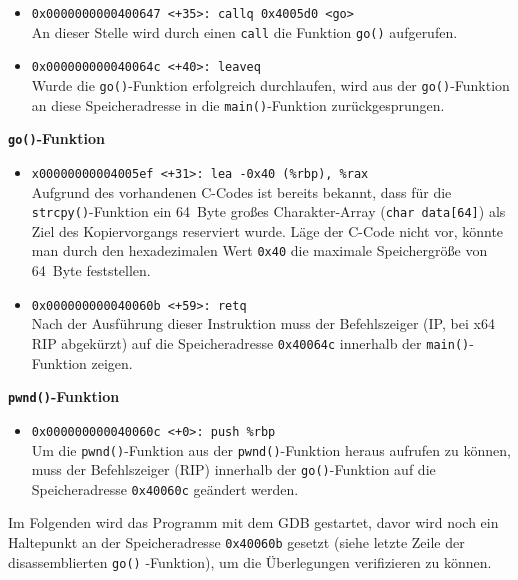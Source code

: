 \begin{itemize}
      \item \texttt{0x0000000000400647 <+35>:    callq  0x4005d0 <go>}\\
        An dieser Stelle wird durch einen \texttt{call} die Funktion \texttt{go()} aufgerufen.
      \item \texttt{0x000000000040064c <+40>:    leaveq}\\
        Wurde die \texttt{go()}-Funktion erfolgreich durchlaufen, wird aus der \texttt{go()}-Funktion an diese Speicheradresse in die \texttt{main()}-Funktion zurückgesprungen.       
\end{itemize}
\textbf{\texttt{go()}-Funktion}

\begin{itemize}
      \item \texttt{x00000000004005ef <+31>:    lea    -0x40	(\%rbp), \%rax}\\
        Aufgrund des vorhandenen C-Codes ist bereits bekannt, dass für die \texttt{strcpy()}-Funktion ein \SI{64}{Byte} großes Charakter-Array (\texttt{char data[64]}) als Ziel des Kopiervorgangs reserviert wurde. Läge der C-Code nicht vor, könnte man durch den hexadezimalen Wert \texttt{0x40} die maximale Speichergröße von \SI{64}{Byte} feststellen.        
      \item \texttt{0x000000000040060b <+59>:    retq}\\
        Nach der Ausführung dieser Instruktion muss der Befehlszeiger (IP, bei x64 RIP abgekürzt) auf die Speicheradresse \texttt{0x40064c} innerhalb der \texttt{main()}-Funktion zeigen.
\end{itemize}



\textbf{\texttt{pwnd()}-Funktion}

\begin{itemize}
      \item \texttt{0x000000000040060c <+0>:     push   \%rbp}\\
        Um die \texttt{pwnd()}-Funktion aus der \texttt{pwnd()}-Funktion heraus aufrufen zu können, muss der Befehlszeiger (RIP) innerhalb der \texttt{go()}-Funktion auf die Speicheradresse \texttt{0x40060c} geändert werden. 
\end{itemize}

\newpage
Im Folgenden wird das Programm mit dem GDB gestartet, davor wird noch ein 
Haltepunkt an der Speicheradresse \texttt{0x40060b} gesetzt (siehe 
letzte Zeile der disassemblierten \texttt{go()} -Funktion), um die 
Überlegungen verifizieren zu können.
        
